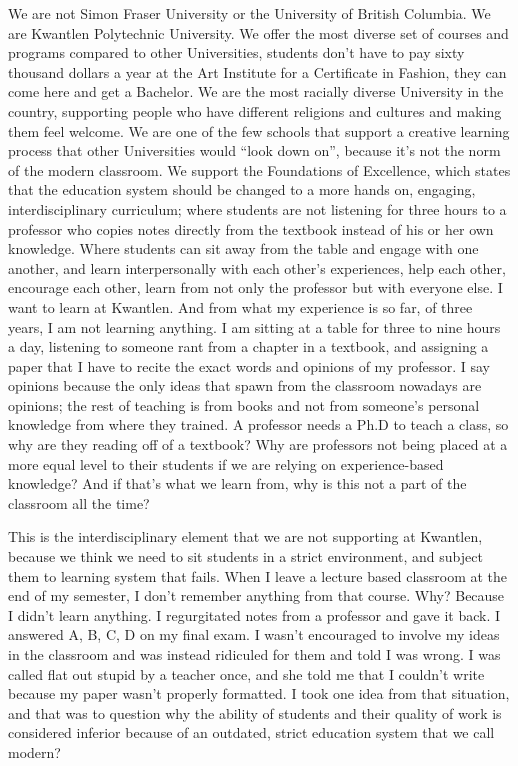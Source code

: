 \documentclass[letterpaper,10pt,headsepline]{scrreprt}
\begin{document}
We are not Simon Fraser University or the University of British Columbia. We are Kwantlen Polytechnic University. We offer the most diverse set of courses and programs compared to other Universities, students don’t have to pay sixty thousand dollars a year at the Art Institute for a Certificate in Fashion, they can come here and get a Bachelor. We are the most racially diverse University in the country, supporting people who have different religions and cultures and making them feel welcome. We are one of the few schools that support a creative learning process that other Universities would “look down on”, because it’s not the norm of the modern classroom. We support the Foundations of Excellence, which states that the education system should be changed to a more hands on, engaging, interdisciplinary curriculum; where students are not listening for three hours to a professor who copies notes directly from the textbook instead of his or her own knowledge. Where students can sit away from the table and engage with one another, and learn interpersonally with each other’s experiences, help each other, encourage each other, learn from not only the professor but with everyone else. I want to learn at Kwantlen. And from what my experience is so far, of three years, I am not learning anything. I am sitting at a table for three to nine hours a day, listening to someone rant from a chapter in a textbook, and assigning a paper that I have to recite the exact words and opinions of my professor. I say opinions because the only ideas that spawn from the classroom nowadays are opinions; the rest of teaching is from books and not from someone’s personal knowledge from where they trained. A professor needs a Ph.D to teach a class, so why are they reading off of a textbook? Why are professors not being placed at a more equal level to their students if we are relying on experience-based knowledge? And if that’s what we learn from, why is this not a part of the classroom all the time? 

This is the interdisciplinary element that we are not supporting at Kwantlen, because we think we need to sit students in a strict environment, and subject them to learning system that fails. When I leave a lecture based classroom at the end of my semester, I don’t remember anything from that course. Why? Because I didn’t learn anything. I regurgitated notes from a professor and gave it back. I answered A, B, C, D on my final exam. I wasn’t encouraged to involve my ideas in the classroom and was instead ridiculed for them and told I was wrong. I was called flat out stupid by a teacher once, and she told me that I couldn’t write because my paper wasn’t properly formatted. I took one idea from that situation, and that was to question why the ability of students and their quality of work is considered inferior because of an outdated, strict education system that we call modern?
\end{document}
